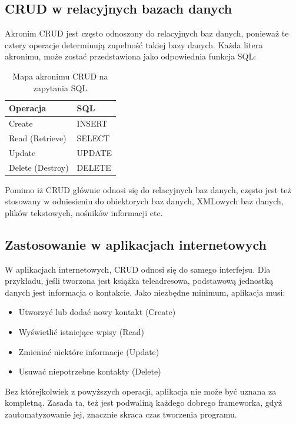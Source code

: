 \documentclass[a4paper,12pt,oneside]{report}
\begin{document}
\subsection{CRUD w relacyjnych bazach danych}
\label{sub:crud-db}
Akronim CRUD jest często odnoszony do relacyjnych baz danych, ponieważ te cztery operacje determinują zupełność takiej bazy danych. Każda litera akronimu, może zostać przedstawiona jako odpowiednia funkcja SQL:
\begin{table}[h]
  \centering
    \begin{tabular}{|l|l|} \hline
    Operacja         & SQL \\\hline
    Create           & INSERT \\
    Read (Retrieve)  & SELECT \\
    Update           & UPDATE \\
    Delete (Destroy) & DELETE \\\hline
    \end{tabular}
    \caption{Mapa akronimu CRUD na zapytania SQL\label{crud:sql}}
\end{table}
Pomimo iż CRUD głównie odnosi się do relacyjnych baz danych, często jest też stosowany w odniesieniu do obiektorych baz danych, XMLowych baz danych, plików tekstowych, nośników informacji etc.

\subsection{Zastosowanie w aplikacjach internetowych}
\label{crud:web}
W aplikacjach internetowych, CRUD odnosi się do samego interfejsu. Dla przykładu, jeśli tworzona jest książka teleadresowa, podstawową jednostką danych jest informacja o kontakcie. Jako niezbędne minimum, aplikacja musi:

\begin{itemize}
  \item Utworzyć lub dodać nowy kontakt (Create)
  \item Wyświetlić istniejące wpisy (Read)
  \item Zmieniać niektóre informacje (Update)
  \item Usuwać niepotrzebne kontakty (Delete)
\end{itemize}

Bez którejkolwiek z powyższych operacji, aplikacja nie może być uznana za kompletną. Zasada ta, też jest podwaliną każdego dobrego frameworka, gdyż zautomatyzowanie jej, znacznie skraca czas tworzenia programu.
\end{document}
